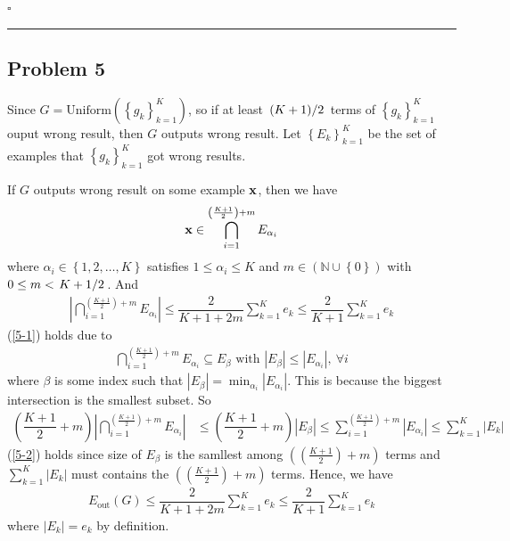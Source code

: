 \documentclass[12pt]{article}
\newcommand*{\QEDB}{\hfill\ensuremath{\square}}
\newcommand{\CBrackets}[1]{\left\{#1\right\}}
\newcommand{\ParTh}[1]{\left(#1\right)}
\newcommand{\BF}[1]{{\bf#1}}
\newcommand{\AbsVal}[1]{\left|#1\right|}
\newcommand{\Divide}[2]{\left.#1\middle/#2\right.}
\newcommand{\horrule}[1]{\rule{\linewidth}{#1}}
\begin{document}
\QEDB

\horrule{0.5pt}

\subsection*{Problem 5}

Since $G=\text{Uniform}\ParTh{\CBrackets{g_k}^K_{k=1}}$, so if at least $\Divide{\ParTh{K+1}}{2}$ terms of $\CBrackets{g_k}^K_{k=1}$ ouput wrong result, then $G$ outputs wrong result. Let $\CBrackets{E_k}^K_{k=1}$ be the set of examples that $\CBrackets{g_k}^K_{k=1}$ got wrong results.

If $G$ outputs wrong result on some example $\BF{x}$, then we have
\begin{align}
\BF{x}\in\bigcap^{\ParTh{\frac{{K+1}}{2}}+m}_{i=1}E_{\alpha_i}
\end{align}
where $\alpha_i\in\CBrackets{1,2,\ldots,K}$ satisfies $1\leq\alpha_i\leq K$ and $m\in\ParTh{\mathbb{N}\cup\CBrackets{0}}$ with $0\leq m<\Divide{{K+1}}{2}$. And
\begin{align}
\AbsVal{\bigcap^{\ParTh{\frac{{K+1}}{2}}+m}_{i=1}E_{\alpha_i}}\leq\dfrac{2}{K+1+2m}\sum_{k=1}^{K}e_k\leq\dfrac{2}{K+1}\sum_{k=1}^{K}e_k
\label{5-1}
\end{align}
(\ref{5-1}) holds due to %
\begin{align}
\bigcap^{\ParTh{\frac{{K+1}}{2}}+m}_{i=1}E_{\alpha_i}\subseteq E_{\beta}\text{ with }\AbsVal{E_\beta}\leq\AbsVal{E_{\alpha_i}},~\forall i
\end{align}
where $\beta$ is some index such that $\AbsVal{E_{\beta}}=\min_{\alpha_i}\AbsVal{E_{\alpha_i}}$. This is because the biggest intersection is the smallest subset. So
\begin{align}
\ParTh{\dfrac{K+1}{2}+m}\AbsVal{\bigcap^{\ParTh{\frac{{K+1}}{2}}+m}_{i=1}E_{\alpha_i}}&\leq\ParTh{\dfrac{K+1}{2}+m}\AbsVal{E_{\beta}}\leq\sum_{i=1}^{\ParTh{\frac{{K+1}}{2}}+m}\AbsVal{E_{\alpha_i}}\leq\sum_{k=1}^{K}\AbsVal{E_k}
\label{5-2}
\end{align}
(\ref{5-2}) holds since size of $E_\beta$ is the samllest among $\ParTh{\ParTh{\frac{{K+1}}{2}}+m}$ terms and $\sum_{k=1}^{K}\AbsVal{E_k}$ must contains the $\ParTh{\ParTh{\frac{{K+1}}{2}}+m}$ terms. Hence, we have
\begin{align}
E_{\text{out}}\ParTh{G}\leq\dfrac{2}{K+1+2m}\sum_{k=1}^{K}e_k\leq\dfrac{2}{K+1}\sum_{k=1}^{K}e_k
\end{align}
where $\AbsVal{E_k}=e_k$ by definition.

\end{document}
